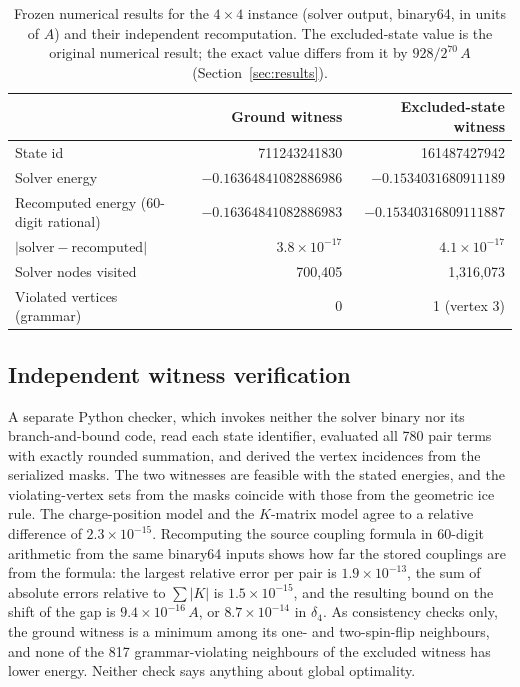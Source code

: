 \documentclass[11pt,a4paper]{article}
\theoremstyle{plain}
\theoremstyle{definition}
\theoremstyle{remark}
\begin{document}
\begin{table}[t]
\centering\small
\caption{Frozen numerical results for the $4\times4$ instance (solver output, binary64, in units of $A$) and their independent recomputation. The excluded-state value is the original numerical result; the exact value differs from it by $928/2^{70}\,A$ (Section~\ref{sec:results}).}
\label{tab:gap4num}
\begin{tabular}{@{}lrr@{}}
\toprule
 & Ground witness & Excluded-state witness\\
\midrule
State id & 711243241830 & 161487427942\\
Solver energy & $-0.16364841082886986$ & $-0.1534031680911189$\\
Recomputed energy (60-digit rational) & $-0.16364841082886983$ & $-0.15340316809111887$\\
$|\text{solver}-\text{recomputed}|$ & $3.8\times10^{-17}$ & $4.1\times10^{-17}$\\
Solver nodes visited & 700{,}405 & 1{,}316{,}073\\
Violated vertices (grammar) & 0 & 1 (vertex 3)\\
\bottomrule
\end{tabular}
\end{table}

\subsection{Independent witness verification}
A separate Python checker, which invokes neither the solver binary nor its branch-and-bound code, read each state identifier, evaluated all 780 pair terms with exactly rounded summation, and derived the vertex incidences from the serialized masks. The two witnesses are feasible with the stated energies, and the violating-vertex sets from the masks coincide with those from the geometric ice rule. The charge-position model and the $K$-matrix model agree to a relative difference of $2.3\times10^{-15}$. Recomputing the source coupling formula in 60-digit arithmetic from the same binary64 inputs shows how far the stored couplings are from the formula: the largest relative error per pair is $1.9\times10^{-13}$, the sum of absolute errors relative to $\sum|K|$ is $1.5\times10^{-15}$, and the resulting bound on the shift of the gap is $9.4\times10^{-16}\,A$, or $8.7\times10^{-14}$ in $\delta_4$. As consistency checks only, the ground witness is a minimum among its one- and two-spin-flip neighbours, and none of the 817 grammar-violating neighbours of the excluded witness has lower energy. Neither check says anything about global optimality.
\end{document}
